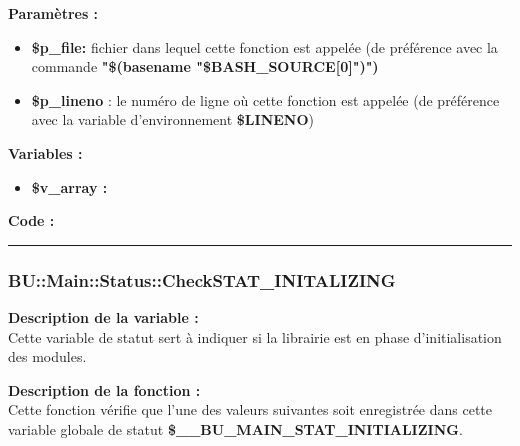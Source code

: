 \documentclass[a4paper,10pt]{article}
\begin{document}
\begin{justify}
    \textbf{Paramètres :}
    \begin{itemize}
        \item \textbf{\color{orange}\$p\_file\color{white}:} fichier dans lequel cette fonction est appelée (de préférence avec la commande \textbf{\textbf{"\$(\color{gray}basename \color{white}"\color{orange}\$BASH\_SOURCE[0]\color{white}")")}}\\

        \item \color{orange}\textbf{\$p\_lineno}\color{white} : le numéro de ligne où cette fonction est appelée (de préférence avec la variable d'environnement \textbf{\color{orange}\$LINENO})
    \end{itemize}
\end{justify}

\begin{justify}
    \textbf{Variables :}

    \begin{itemize}
        \item \textbf{\color{orange}\$v\_array\color{white} :}
    \end{itemize}
\end{justify}

\begin{justify}
    \textbf{Code :}
\end{justify}


\color{blue}\par\noindent\rule{\textwidth}{0.4pt}\color{white}

\color{blue}
\subsubsection{\color{mauve}BU::Main::Status::CheckSTAT\_INITALIZING}\color{white}

\begin{justify}
    \textbf{Description de la variable :}\\
    Cette variable de statut sert à indiquer si la librairie est en phase d'initialisation des modules.
\end{justify}

\begin{justify}
    \textbf{Description de la fonction :}\\
    Cette fonction vérifie que l'une des valeurs suivantes soit enregistrée dans cette variable globale de statut \textbf{\color{orange}\$\_\_BU\_MAIN\_STAT\_INITIALIZING}.
\end{justify}
\end{document}
